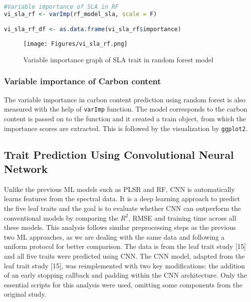 \documentclass[12pt,a4paper]{report}
\begin{document}
\begin{lstlisting}[language=R, style=mystyle]
#Variable importance of SLA in RF
vi_sla_rf <- varImp(rf_model_sla, scale = F)

vi_sla_rf_df <- as.data.frame(vi_sla_rf$importance)
\end{lstlisting}

\begin{figure}[h]
    \centering
    \texttt{[image: Figures/vi\_sla\_rf.png]}
    \caption{Variable importance graph of SLA trait in random forest model}
    \label{fig:vi_sla_rf}
\end{figure}

\subsubsection*{Variable importance of Carbon content}
The variable importance in carbon content prediction using random forest is also measured with the help of \texttt{varImp} function. The model corresponds to the carbon content is passed on to the function and it created a train object, from which the importance scores are extracted. This is followed by the visualization by \texttt{ggplot2}.\\

\subsection{Trait Prediction Using Convolutional Neural Network}
Unlike the previous ML models such as PLSR and RF,  CNN is automatically learns features from the spectral data. It is a deep learning approach to predict the five leaf traits and the goal is to evaluate whether CNN can outperform the conventional models by comparing the $R^2$, RMSE and training time across all these models. This analysis follows similar preprocessing steps as the previous two ML approaches, as we are dealing with the same data and following a uniform protocol for better comparison. The data is from the leaf trait study [15] and all five traits were predicted using CNN. The CNN model, adapted from the leaf trait study [15], was reimplemented with two key modifications: the addition of an early stopping callback and padding within the CNN architecture.  Only the essential scripts for this analysis were used, omitting some components from the original study. \\
\end{document}
